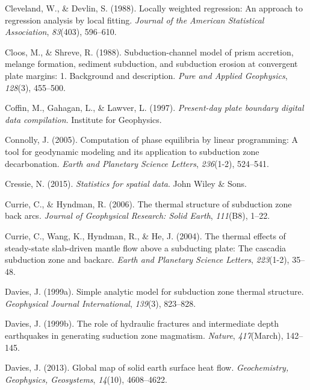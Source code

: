 \begin{CSLReferences}{1}{1}
\leavevmode{}%
Cleveland, W., \& Devlin, S. (1988). Locally weighted regression: An approach to regression analysis by local fitting. \emph{Journal of the American Statistical Association}, \emph{83}(403), 596--610.

\leavevmode{}%
Cloos, M., \& Shreve, R. (1988). Subduction-channel model of prism accretion, melange formation, sediment subduction, and subduction erosion at convergent plate margins: 1. Background and description. \emph{Pure and Applied Geophysics}, \emph{128}(3), 455--500.

\leavevmode{}%
Coffin, M., Gahagan, L., \& Lawver, L. (1997). \emph{Present-day plate boundary digital data compilation}. Institute for Geophysics.

\leavevmode{}%
Connolly, J. (2005). Computation of phase equilibria by linear programming: A tool for geodynamic modeling and its application to subduction zone decarbonation. \emph{Earth and Planetary Science Letters}, \emph{236}(1-2), 524--541.

\leavevmode{}%
Cressie, N. (2015). \emph{Statistics for spatial data}. John Wiley \& Sons.

\leavevmode{}%
Currie, C., \& Hyndman, R. (2006). The thermal structure of subduction zone back arcs. \emph{Journal of Geophysical Research: Solid Earth}, \emph{111}(B8), 1--22.

\leavevmode{}%
Currie, C., Wang, K., Hyndman, R., \& He, J. (2004). The thermal effects of steady-state slab-driven mantle flow above a subducting plate: The cascadia subduction zone and backarc. \emph{Earth and Planetary Science Letters}, \emph{223}(1-2), 35--48.

\leavevmode{}%
Davies, J. (1999a). Simple analytic model for subduction zone thermal structure. \emph{Geophysical Journal International}, \emph{139}(3), 823--828.

\leavevmode{}%
Davies, J. (1999b). The role of hydraulic fractures and intermediate depth earthquakes in generating suduction zone magmatism. \emph{Nature}, \emph{417}(March), 142--145.

\leavevmode{}%
Davies, J. (2013). Global map of solid earth surface heat flow. \emph{Geochemistry, Geophysics, Geosystems}, \emph{14}(10), 4608--4622.


\end{CSLReferences}
